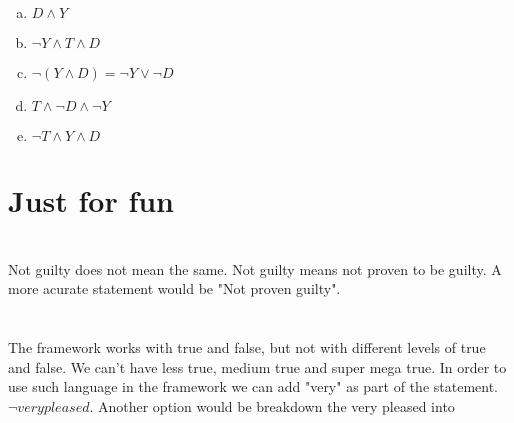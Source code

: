 \documentclass{article}
\begin{document}
\section{}
\begin{enumerate}[a.]
\item $D \wedge Y$
\item $\neg Y \wedge T \wedge D$
\item $\neg(Y \wedge D) = \neg Y \vee \neg D$
\item $T \wedge \neg D \wedge \neg Y$
\item $\neg T \wedge Y \wedge D$
\end{enumerate}

\section {Just for fun}

\section{}
Not guilty does not mean the same.
Not guilty means not proven to be guilty.
A more acurate statement would be "Not proven guilty".

\section{}
The framework works with true and false, but not with different levels of true and false. We can't have less true, medium true and super mega true.
In order to use such language in the framework we can add "very" as part of the statement. $\neg very pleased$. Another option would be breakdown the very pleased into 
\end{document}
